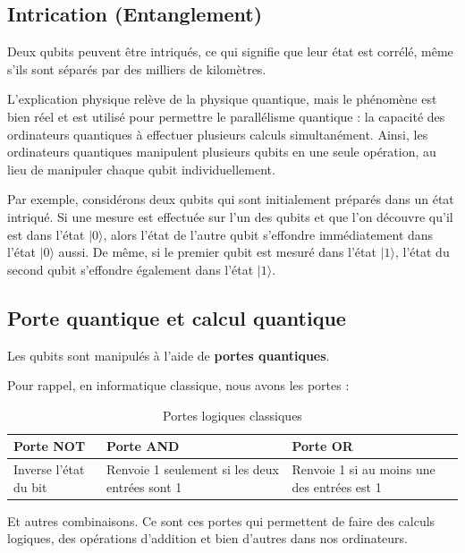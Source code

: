 \documentclass{article}
\begin{document}
\subsection{Intrication (Entanglement)}

Deux qubits peuvent être intriqués, ce qui signifie que leur état est corrélé, même s’ils sont séparés par des milliers de kilomètres.

L’explication physique relève de la physique quantique, mais le phénomène est bien réel et est utilisé pour permettre le parallélisme quantique : la capacité des ordinateurs quantiques à effectuer plusieurs calculs simultanément. Ainsi, les ordinateurs quantiques manipulent plusieurs qubits en une seule opération, au lieu de manipuler chaque qubit individuellement.

Par exemple, considérons deux qubits qui sont initialement préparés dans un état intriqué. Si une mesure est effectuée sur l’un des qubits et que l’on découvre qu’il est dans l’état $|0\rangle$, alors l’état de l’autre qubit s’effondre immédiatement dans l’état $|0\rangle$ aussi. De même, si le premier qubit est mesuré dans l’état $|1\rangle$, l’état du second qubit s’effondre également dans l’état $|1\rangle$.\cite{microsoftEntanglement2025}

\subsection{Porte quantique et calcul quantique}

Les qubits sont manipulés à l’aide de \textbf{portes quantiques}.

Pour rappel, en informatique classique, nous avons les portes :

\begin{table}[H]
\centering
\begin{tabularx}{\textwidth}{|X|X|X|}
  \hline
  \textbf{Porte NOT} & \textbf{Porte AND} & \textbf{Porte OR} \\
  \hline
  Inverse l'état du bit & 
  Renvoie 1 seulement si les deux entrées sont 1 & 
  Renvoie 1 si au moins une des entrées est 1 \\
  \hline
\end{tabularx}
\caption{Portes logiques classiques}
\end{table}

Et autres combinaisons. Ce sont ces portes qui permettent de faire des calculs logiques, des opérations d'addition et bien d'autres dans nos ordinateurs.
\end{document}

